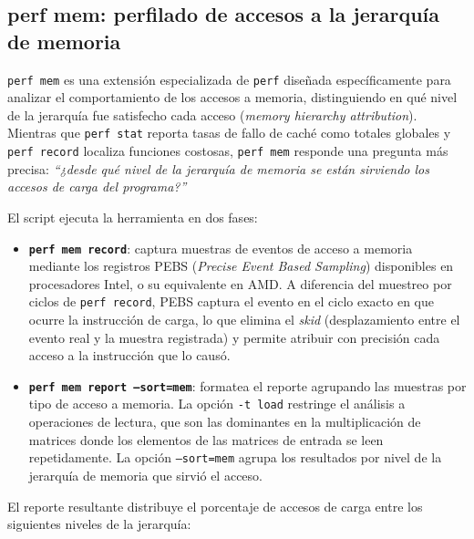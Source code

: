 \subsection{perf mem: perfilado de accesos a la jerarquía de memoria}

\texttt{perf mem} es una extensión especializada de \texttt{perf} diseñada
específicamente para analizar el comportamiento de los accesos a memoria,
distinguiendo en qué nivel de la jerarquía fue satisfecho cada acceso
(\textit{memory hierarchy attribution}).
Mientras que \texttt{perf stat} reporta tasas de fallo de caché como totales
globales y \texttt{perf record} localiza funciones costosas, \texttt{perf mem}
responde una pregunta más precisa: \textit{``¿desde qué nivel de la jerarquía
de memoria se están sirviendo los accesos de carga del programa?''}

El script ejecuta la herramienta en dos fases:

\begin{itemize}
    \item \textbf{\texttt{perf mem record}}: captura muestras de eventos de
        acceso a memoria mediante los registros PEBS (\textit{Precise Event
        Based Sampling}) disponibles en procesadores Intel, o su equivalente
        en AMD.
        A diferencia del muestreo por ciclos de \texttt{perf record}, PEBS
        captura el evento en el ciclo exacto en que ocurre la instrucción de
        carga, lo que elimina el \textit{skid} (desplazamiento entre el evento
        real y la muestra registrada) y permite atribuir con precisión cada
        acceso a la instrucción que lo causó.
    \item \textbf{\texttt{perf mem report --sort=mem}}: formatea el reporte
        agrupando las muestras por tipo de acceso a memoria.
        La opción \texttt{-t load} restringe el análisis a operaciones de
        lectura, que son las dominantes en la multiplicación de matrices donde
        los elementos de las matrices de entrada se leen repetidamente.
        La opción \texttt{--sort=mem} agrupa los resultados por nivel de la
        jerarquía de memoria que sirvió el acceso.
\end{itemize}

El reporte resultante distribuye el porcentaje de accesos de carga entre los
siguientes niveles de la jerarquía:

